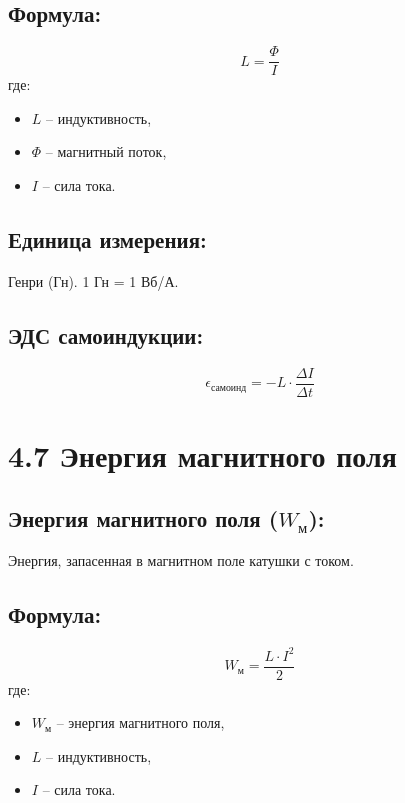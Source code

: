 \documentclass[a4paper,12pt]{article}
\begin{document}
\vspace{-9pt}
\subsection*{Формула:}
\vspace{-3pt}
\vspace{-0.05em}
$$ L = \frac{\Phi}{I} $$
где:
\begin{itemize}
    \item $L$ – индуктивность,
    \item $\Phi$ – магнитный поток,
    \item $I$ – сила тока.
\end{itemize}

\vspace{-9pt}
\subsection*{Единица измерения:}
\vspace{-3pt}
Генри (Гн). 1 Гн = 1 Вб/А.

\vspace{-9pt}
\subsection*{ЭДС самоиндукции:}
\vspace{-3pt}
\vspace{-0.05em}
$$ \epsilon_{самоинд} = -L \cdot \frac{\Delta I}{\Delta t} $$

\section*{4.7 Энергия магнитного поля}
\vspace{-9pt}
\subsection*{Энергия магнитного поля ($W_м$):}
\vspace{-3pt}
Энергия, запасенная в магнитном поле катушки с током.

\vspace{-9pt}
\subsection*{Формула:}
\vspace{-3pt}
\vspace{-0.05em}
$$ W_м = \frac{L \cdot I^2}{2} $$
где:
\begin{itemize}
    \item $W_м$ – энергия магнитного поля,
    \item $L$ – индуктивность,
    \item $I$ – сила тока.
\end{itemize}
\end{document}
